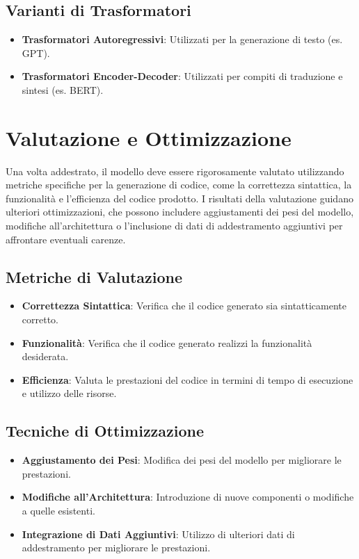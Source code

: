 \documentclass[12pt,a4paper,openright,twoside]{book}
\begin{document}
\subsection{Varianti di Trasformatori}
\begin{itemize}
    \item \textbf{Trasformatori Autoregressivi}: Utilizzati per la generazione di testo (es. GPT).
    \item \textbf{Trasformatori Encoder-Decoder}: Utilizzati per compiti di traduzione e sintesi (es. BERT).
\end{itemize}

\section{Valutazione e Ottimizzazione}
Una volta addestrato, il modello deve essere rigorosamente valutato utilizzando metriche specifiche per la generazione di codice, come la correttezza sintattica, la funzionalità e l'efficienza del codice prodotto. I risultati della valutazione guidano ulteriori ottimizzazioni, che possono includere aggiustamenti dei pesi del modello, modifiche all'architettura o l'inclusione di dati di addestramento aggiuntivi per affrontare eventuali carenze.

\subsection{Metriche di Valutazione}
\begin{itemize}
    \item \textbf{Correttezza Sintattica}: Verifica che il codice generato sia sintatticamente corretto.
    \item \textbf{Funzionalità}: Verifica che il codice generato realizzi la funzionalità desiderata.
    \item \textbf{Efficienza}: Valuta le prestazioni del codice in termini di tempo di esecuzione e utilizzo delle risorse.
\end{itemize}

\subsection{Tecniche di Ottimizzazione}
\begin{itemize}
    \item \textbf{Aggiustamento dei Pesi}: Modifica dei pesi del modello per migliorare le prestazioni.
    \item \textbf{Modifiche all'Architettura}: Introduzione di nuove componenti o modifiche a quelle esistenti.
    \item \textbf{Integrazione di Dati Aggiuntivi}: Utilizzo di ulteriori dati di addestramento per migliorare le prestazioni.
\end{itemize}
\end{document}
